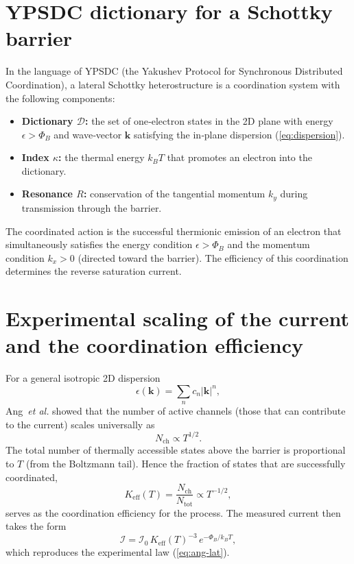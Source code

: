 \documentclass[12pt,a4paper]{article}
\newcommand{\Keff}{K_{\mathrm{eff}}}
\begin{document}
	\section{YPSDC dictionary for a Schottky barrier}
	In the language of YPSDC (the Yakushev Protocol for Synchronous
	Distributed Coordination), a lateral Schottky heterostructure is a
	coordination system with the following components:
	\begin{itemize}
		\item \textbf{Dictionary $\mathcal{D}$:} the set of one‑electron
		states in the 2D plane with energy $\epsilon > \Phi_B$ and
		wave‑vector $\mathbf{k}$ satisfying the in‑plane dispersion
		(\ref{eq:dispersion}).
		\item \textbf{Index $\kappa$:} the thermal energy $k_B T$ that
		promotes an electron into the dictionary.
		\item \textbf{Resonance $R$:} conservation of the
		tangential momentum $k_y$ during transmission through the barrier.
	\end{itemize}
	The coordinated action is the successful thermionic emission of an
	electron that simultaneously satisfies the energy condition
	$\epsilon > \Phi_B$ and the momentum condition $k_x > 0$ (directed
	toward the barrier). The efficiency of this coordination determines
	the reverse saturation current.
	
	\section{Experimental scaling of the current and the coordination efficiency}
	
	For a general isotropic 2D dispersion
	\begin{equation}
		\epsilon(\mathbf{k}) = \sum_n c_n |\mathbf{k}|^n,
		\label{eq:dispersion}
	\end{equation}
	Ang~\emph{et al.} showed that the number of active channels
	(those that can contribute to the current) scales universally as
	\begin{equation}
		N_{\mathrm{ch}} \propto T^{1/2}.
		\label{eq:Nch}
	\end{equation}
	The total number of thermally accessible states above the barrier
	is proportional to $T$ (from the Boltzmann tail). Hence the fraction
	of states that are successfully coordinated,
	\begin{equation}
		\Keff(T) = \frac{N_{\mathrm{ch}}}{N_{\mathrm{tot}}} \propto T^{-1/2},
		\label{eq:keff-T}
	\end{equation}
	serves as the coordination efficiency for the process. The measured
	current then takes the form
	\begin{equation}
		\mathcal{I} = \mathcal{I}_0 \, \Keff(T)^{-3} \, e^{-\Phi_B/k_B T},
		\label{eq:I-via-keff}
	\end{equation}
	which reproduces the experimental law (\ref{eq:ang-lat}).
	
\end{document}
